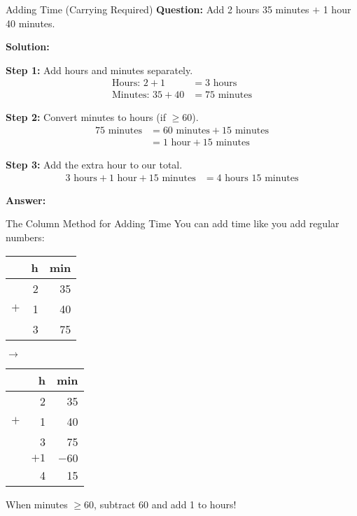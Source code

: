 \documentclass[12pt,a4paper]{article}
\begin{document}
\begin{examplebox}{Adding Time (Carrying Required)}
\textbf{Question:} Add 2 hours 35 minutes $+$ 1 hour 40 minutes.

\textbf{Solution:}

\textbf{Step 1:} Add hours and minutes separately.
\begin{align*}
\text{Hours: } 2 + 1 &= 3\text{ hours} \\
\text{Minutes: } 35 + 40 &= 75\text{ minutes}
\end{align*}

\textbf{Step 2:} Convert minutes to hours (if $\geq 60$).
\begin{align*}
75\text{ minutes} &= 60\text{ minutes} + 15\text{ minutes} \\
&= 1\text{ hour} + 15\text{ minutes}
\end{align*}

\textbf{Step 3:} Add the extra hour to our total.
\begin{align*}
3\text{ hours} + 1\text{ hour} + 15\text{ minutes} &= 4\text{ hours }15\text{ minutes}
\end{align*}

\textbf{Answer:} 
\end{examplebox}

\begin{tipbox}{The Column Method for Adding Time}
You can add time like you add regular numbers:

\begin{center}
\begin{tabular}{r|rr}
& \textbf{h} & \textbf{min} \\
\hline
& 2 & 35 \\
$+$ & 1 & 40 \\
\hline
& 3 & 75 \\
\end{tabular}
\quad $\rightarrow$ \quad
\begin{tabular}{r|rr}
& \textbf{h} & \textbf{min} \\
\hline
& 2 & 35 \\
$+$ & 1 & 40 \\
\hline
& 3 & 75 \\
& $+1$ & $-60$ \\
\hline
& 4 & 15 \\
\end{tabular}
\end{center}

When minutes $\geq 60$, subtract 60 and add 1 to hours!
\end{tipbox}
\end{document}
